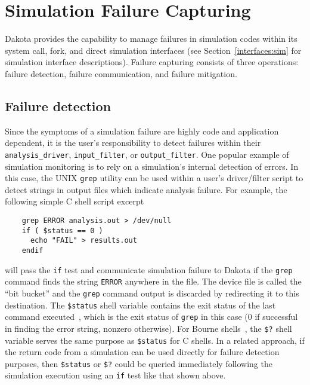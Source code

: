 \chapter{Simulation Failure Capturing}\label{failure}

Dakota provides the capability to manage failures in simulation codes
within its system call, fork, and direct simulation interfaces (see
Section~\ref{interfaces:sim} for simulation interface descriptions).
Failure capturing consists of three operations: failure detection,
failure communication, and failure mitigation.

\section{Failure detection}\label{failure:detection}

Since the symptoms of a simulation failure are highly code and
application dependent, it is the user's responsibility to detect
failures within their \texttt{analysis\_driver},
\texttt{input\_filter}, or \texttt{output\_filter}. One popular 
example of simulation monitoring is to rely on a simulation's internal
detection of errors.  In this case, the UNIX \texttt{grep} utility can
be used within a user's driver/filter script to detect strings in
output files which indicate analysis failure. For example, the
following simple C shell script excerpt
\begin{verbatim}
    grep ERROR analysis.out > /dev/null
    if ( $status == 0 )
      echo "FAIL" > results.out
    endif
\end{verbatim}

will pass the \texttt{if} test and communicate simulation failure to
Dakota if the \texttt{grep} command finds the string \texttt{ERROR}
anywhere in the  file. The 
device file is called the ``bit bucket'' and the \texttt{grep} command
output is discarded by redirecting it to this destination. The
\texttt{\$status} shell variable contains the exit status of the last
command executed~\cite{And86}, which is the exit status of \texttt{grep}
in this case (0 if successful in finding the error string, nonzero
otherwise). For Bourne shells~\cite{Bli96}, the \texttt{\$?} shell
variable serves the same purpose as \texttt{\$status} for C shells. In
a related approach, if the return code from a simulation can be used
directly for failure detection purposes, then \texttt{\$status} or
\texttt{\$?} could be queried immediately following the simulation
execution using an \texttt{if} test like that shown above.


